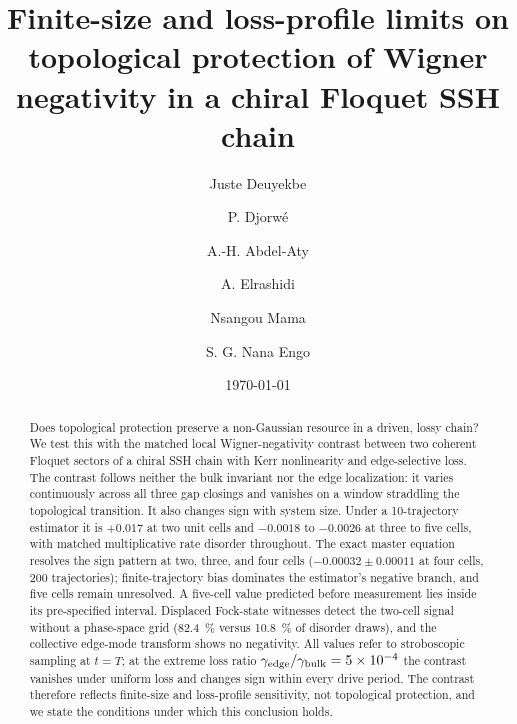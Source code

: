 \documentclass[aps,pra,preprint,superscriptaddress,amsmath,amssymb]{revtex4-2}
\begin{document}
\title{Finite-size and loss-profile limits on topological protection of Wigner negativity in a chiral Floquet SSH chain}

\author{Juste Deuyekbe}

\author{P. Djorw\'e}

\author{A.-H. Abdel-Aty}

\author{A. Elrashidi}

\author{Nsangou Mama}

\author{S. G. Nana Engo}

\date{\today}

\begin{abstract}
Does topological protection preserve a non-Gaussian resource in a driven, lossy chain? We test this with the matched local Wigner-negativity contrast between two coherent Floquet sectors of a chiral SSH chain with Kerr nonlinearity and edge-selective loss. The contrast follows neither the bulk invariant nor the edge localization: it varies continuously across all three gap closings and vanishes on a window straddling the topological transition. It also changes sign with system size. Under a \num{10}-trajectory estimator it is $+\num{0.017}$ at two unit cells and $-\num{0.0018}$ to $-\num{0.0026}$ at three to five cells, with matched multiplicative rate disorder throughout. The exact master equation resolves the sign pattern at two, three, and four cells ($-\num{0.00032}\pm\num{0.00011}$ at four cells, \num{200} trajectories); finite-trajectory bias dominates the estimator's negative branch, and five cells remain unresolved. A five-cell value predicted before measurement lies inside its pre-specified interval. Displaced Fock-state witnesses detect the two-cell signal without a phase-space grid (\qty{82.4}{\percent} versus \qty{10.8}{\percent} of disorder draws), and the collective edge-mode transform shows no negativity. All values refer to stroboscopic sampling at $t=T$; at the extreme loss ratio $\gamma_{\rm edge}/\gamma_{\rm bulk}=\num{5e-4}$ the contrast vanishes under uniform loss and changes sign within every drive period. The contrast therefore reflects finite-size and loss-profile sensitivity, not topological protection, and we state the conditions under which this conclusion holds.
\end{abstract}
\end{document}
